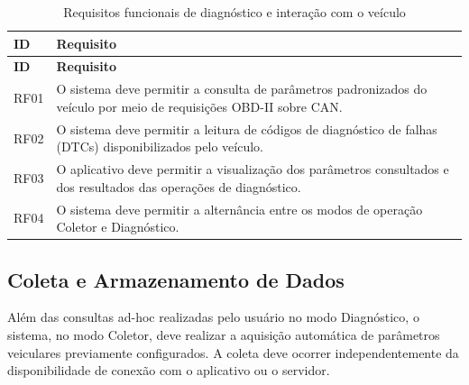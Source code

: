 \begin{longtable}{p{}p{}}
\caption{Requisitos funcionais de diagnóstico e interação com o veículo}
\label{tab:rf-diagnostico}\\
\hline
\textbf{ID} & \textbf{Requisito} \\
\hline
\endfirsthead

\hline
\textbf{ID} & \textbf{Requisito} \\
\hline
\endhead

RF01 & O sistema deve permitir a consulta de parâmetros
padronizados do veículo por meio de requisições OBD-II sobre CAN. \\

RF02 & O sistema deve permitir a leitura de códigos de
diagnóstico de falhas (DTCs) disponibilizados pelo veículo. \\

RF03 & O aplicativo deve permitir a visualização dos parâmetros
consultados e dos resultados das operações de diagnóstico. \\

RF04 & O sistema deve permitir a alternância entre os modos
de operação Coletor e Diagnóstico. \\

\hline
\end{longtable}

\subsection{Coleta e Armazenamento de Dados}

Além das consultas ad-hoc realizadas pelo usuário no modo Diagnóstico, o sistema, no modo Coletor, deve realizar a aquisição automática de parâmetros veiculares previamente configurados. A coleta deve ocorrer independentemente da disponibilidade de conexão com o aplicativo ou o servidor.


